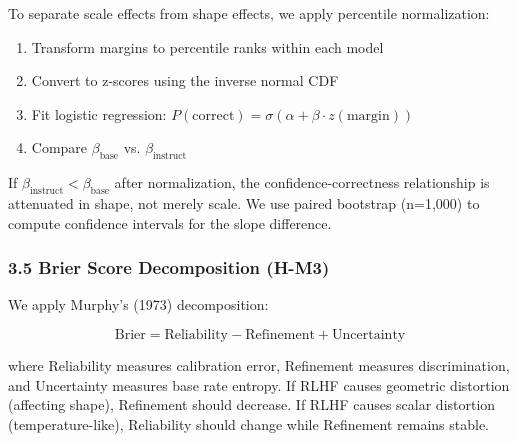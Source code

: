 To separate scale effects from shape effects, we apply percentile normalization:

\begin{enumerate}
\item Transform margins to percentile ranks within each model
\item Convert to z-scores using the inverse normal CDF
\item Fit logistic regression: $P(\text{correct}) = \sigma(\alpha + \beta \cdot z(\text{margin}))$
\item Compare $\beta_{\text{base}}$ vs. $\beta_{\text{instruct}}$
\end{enumerate}

If $\beta_{\text{instruct}} < \beta_{\text{base}}$ after normalization, the confidence-correctness relationship is attenuated in shape, not merely scale. We use paired bootstrap (n=1,000) to compute confidence intervals for the slope difference.

\subsubsection{3.5 Brier Score Decomposition (H-M3)}

We apply Murphy's (1973) decomposition:

$$\text{Brier} = \text{Reliability} - \text{Refinement} + \text{Uncertainty}$$

where Reliability measures calibration error, Refinement measures discrimination, and Uncertainty measures base rate entropy. If RLHF causes geometric distortion (affecting shape), Refinement should decrease. If RLHF causes scalar distortion (temperature-like), Reliability should change while Refinement remains stable.
